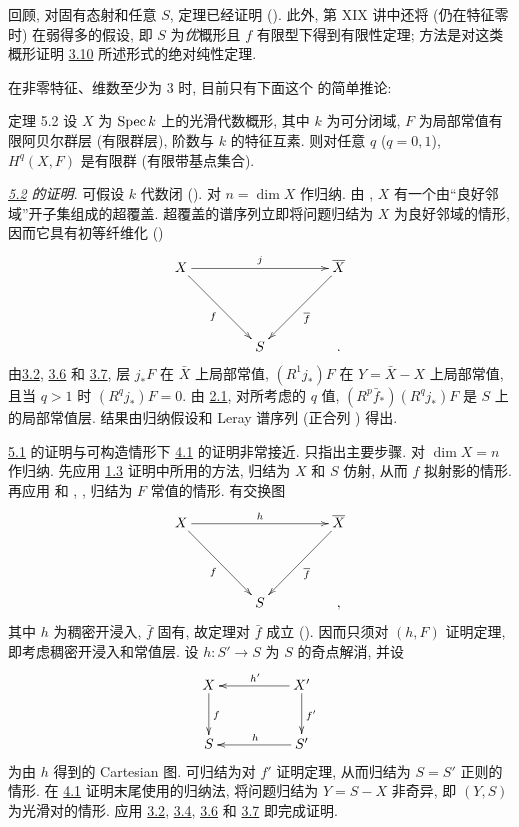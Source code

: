 回顾, 对固有态射和任意 $S$, 定理已经证明 (). 此外, 第 XIX 讲中还将 (仍在特征零时) 在弱得多的假设, 即 $S$ 为\emph{优}概形且 $f$ 有限型下得到有限性定理; 方法是对这类概形证明 \hyperref[XVI.rems3.10]{3.10} 所述形式的绝对纯性定理.

在非零特征、维数至少为 $3$ 时, 目前只有下面这个  的简单推论:

\begin{enonce*}{定理 5.2}
设 $X$ 为 $\operatorname{Spec} k$ 上的光滑代数概形, 其中 $k$ 为可分闭域, $F$ 为局部常值有限阿贝尔群层 (\resp 有限群层), 阶数与 $k$ 的特征互素. 则对任意 $q$ (\resp $q=0,1$), $H^q(X,F)$ 是有限群 (\resp 有限带基点集合).
\end{enonce*}

\noindent
\emph{\hyperref[XVI.thm5.2]{5.2} 的证明}. 可假设 $k$ 代数闭 (). 对 $n=\dim X$ 作归纳. 由 , $X$ 有一个由“良好邻域”开子集组成的超覆盖. 超覆盖的谱序列立即将问题归结为 $X$ 为良好邻域的情形, 因而它具有初等纤维化 ()
$$
\xymatrix@=1.5cm{
X \ar[rr]^{j} \ar[rd]_{f}&         &
\bar{X}\ar[ld]^{\bar{f}} \\
             &      S  & .
}
$$
由\pageoriginale \hyperref[XVI.prop3.2]{3.2}, \hyperref[XVI.cor3.6]{3.6} 和 \hyperref[XVI.thm3.7]{3.7}, 层 $j_*F$ 在 $\bar X$ 上局部常值, $(R^1j_*)F$ 在 $Y=\bar X-X$ 上局部常值, 且当 $q>1$ 时 $(R^qj_*)F=0$. 由 \hyperref[XVI.thm2.1]{2.1}, 对所考虑的 $q$ 值, $(R^p\bar f_*)(R^qj_*)F$ 是 $S$ 上的局部常值层. 结果由归纳假设和 Leray 谱序列 (\resp 正合列 ) 得出.

\hyperref[XVI.thm5.1]{5.1} 的证明与可构造情形下 \hyperref[XVI.thm4.1]{4.1} 的证明非常接近. 只指出主要步骤. 对 $\dim X=n$ 作归纳. 先应用 \hyperref[XVI.lem1.3]{1.3} 证明中所用的方法, 归结为 $X$ 和 $S$ 仿射, 从而 $f$ 拟射影的情形. 再应用  和 , , 归结为 $F$ 常值的情形. 有交换图
$$
\xymatrix@=1.5cm{
X \ar[rr]^{h} \ar[rd]_{f}&         & \bar{X}\ar[ld]^{\bar{f}}\\
             &      S  & ,
}
$$
其中 $h$ 为稠密开浸入, $\bar f$ 固有, 故定理对 $\bar f$ 成立 (). 因而只须对 $(h,F)$ 证明定理, 即考虑稠密开浸入\pageoriginale 和常值层. 设 $h:S'\rightarrow S$ 为 $S$ 的奇点解消, 并设
$$
\xymatrix@C=1.75cm@R=1cm{
X  \ar[d]^{f} & X' \ar[l]_{h'} \ar[d]^{f'}\\
S          & S' \ar[l]_{h}
}
$$
为由 $h$ 得到的 Cartesian 图. 可归结为对 $f'$ 证明定理, 从而归结为 $S=S'$ 正则的情形. 在 \hyperref[XVI.thm4.1]{4.1} 证明末尾使用的归纳法, 将问题归结为 $Y=S-X$ 非奇异, 即 $(Y,S)$ 为光滑对的情形. 应用 \hyperref[XVI.prop3.2]{3.2}, \hyperref[XVI.cor3.4]{3.4}, \hyperref[XVI.cor3.6]{3.6} 和 \hyperref[XVI.thm3.7]{3.7} 即完成证明.

